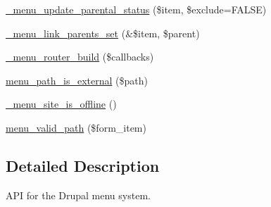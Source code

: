 \begin{CompactItemize}
\item 
\hyperlink{group__menu_g9df6c2183ab9ee0e934eec54a67761d8}{\_\-menu\_\-update\_\-parental\_\-status} (\$item, \$exclude=FALSE)
\item 
\hyperlink{group__menu_g67ab71fff6e17ce3c32752c3bfa00d96}{\_\-menu\_\-link\_\-parents\_\-set} (\&\$item, \$parent)
\item 
\hyperlink{group__menu_g662b13ca71a8b780c9a3b372b25492c3}{\_\-menu\_\-router\_\-build} (\$callbacks)
\item 
\hyperlink{group__menu_gd025fe7dfd80513f2f7baaa66519c508}{menu\_\-path\_\-is\_\-external} (\$path)
\item 
\hyperlink{group__menu_g9ec5f4bcbe8cb76396c1fa9dbbecae5a}{\_\-menu\_\-site\_\-is\_\-offline} ()
\item 
\hyperlink{group__menu_g69ff205e60d5766a074c254060e07456}{menu\_\-valid\_\-path} (\$form\_\-item)
\end{CompactItemize}


\subsection{Detailed Description}
API for the Drupal menu system. 